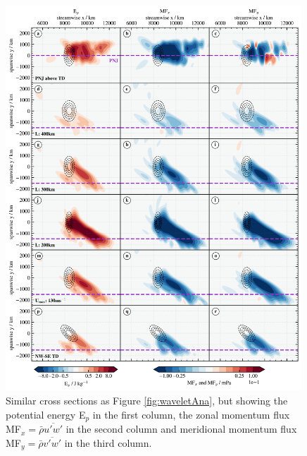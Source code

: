 \begin{figure}[tbp]
    \centering
    \includegraphics[width=0.99\textwidth]{figures_3D/waveletAna_mf.png}
    \caption{Similar cross sections as Figure \ref{fig:waveletAna}, but showing the potential energy E$_p$ in the first column, the zonal momentum flux MF$_x= \bar{\rho} \overbar{u'w'}$ in the second column and meridional momentum flux MF$_y= \bar{\rho} \overbar{v'w'}$ in the third column.}
    \label{fig:waveletAna_mf}
\end{figure}
%
